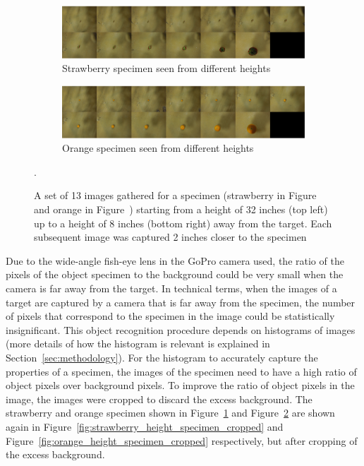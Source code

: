 \documentclass {udthesis}
\begin{document}
\begin{figure}
  \centering
  \begin{subfigure}[]{\textwidth}
      \includegraphics[width=\textwidth]{strawberry_distance_montage.eps}
      \caption{Strawberry specimen seen from different heights}
      \label{fig:strawberry_height_specimen}
  \end{subfigure}
  \begin{subfigure}[]{\textwidth}
      \includegraphics[width=\textwidth]{orange_distance_montage.eps}
      \caption{Orange specimen seen from different heights}
      \label{fig:orange_height_specimen}
  \end{subfigure}
\caption[Set of images collected for each specimen from different heights]{A set of 13 images gathered for a specimen (strawberry in Figure~ and orange in Figure~) starting from a height of 32 inches (top left) up to a height of 8 inches (bottom right) away from the target.
Each subsequent image was captured 2 inches closer to the specimen}.
\label{fig:height_specimen}
\end{figure}	
%
Due to the wide-angle fish-eye lens in the GoPro camera used, the ratio of the pixels of the object specimen to the background could be very small when the camera is far away from the target. In technical terms, when the images of a target are captured by a camera that is far away from the specimen, the number of pixels that correspond to the specimen in the image could be statistically insignificant. This object recognition procedure depends on histograms of images (more details of how the histogram is relevant is explained in Section~\ref{sec:methodology}). 
For the histogram to accurately capture the properties of a specimen, the images of the specimen need to have a high ratio of object pixels over background pixels. To improve the ratio of object pixels in the image, the images were cropped to discard the excess background. The strawberry and orange specimen shown in Figure~\ref{fig:strawberry_height_specimen} and Figure~\ref{fig:orange_height_specimen} are shown again in Figure~\ref{fig:strawberry_height_specimen_cropped} and 
Figure~\ref{fig:orange_height_specimen_cropped} respectively, but after cropping of the excess background.
\end{document}
